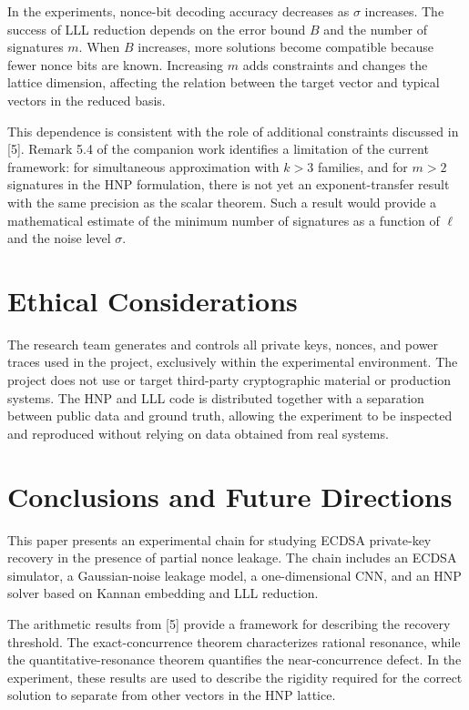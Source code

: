 \documentclass[11pt,a4paper]{article}
\begin{document}
In the experiments, nonce-bit decoding accuracy decreases as $\sigma$ increases. The success of LLL reduction depends on the error bound $B$ and the number of signatures $m$. When $B$ increases, more solutions become compatible because fewer nonce bits are known. Increasing $m$ adds constraints and changes the lattice dimension, affecting the relation between the target vector and typical vectors in the reduced basis.

This dependence is consistent with the role of additional constraints discussed in [5]. Remark 5.4 of the companion work identifies a limitation of the current framework: for simultaneous approximation with $k>3$ families, and for $m>2$ signatures in the HNP formulation, there is not yet an exponent-transfer result with the same precision as the scalar theorem. Such a result would provide a mathematical estimate of the minimum number of signatures as a function of $\ell$ and the noise level $\sigma$.

\section{Ethical Considerations}

The research team generates and controls all private keys, nonces, and power traces used in the project, exclusively within the experimental environment. The project does not use or target third-party cryptographic material or production systems. The HNP and LLL code is distributed together with a separation between public data and ground truth, allowing the experiment to be inspected and reproduced without relying on data obtained from real systems.

\section{Conclusions and Future Directions}

This paper presents an experimental chain for studying ECDSA private-key recovery in the presence of partial nonce leakage. The chain includes an ECDSA simulator, a Gaussian-noise leakage model, a one-dimensional CNN, and an HNP solver based on Kannan embedding and LLL reduction.

The arithmetic results from [5] provide a framework for describing the recovery threshold. The exact-concurrence theorem characterizes rational resonance, while the quantitative-resonance theorem quantifies the near-concurrence defect. In the experiment, these results are used to describe the rigidity required for the correct solution to separate from other vectors in the HNP lattice.
\end{document}
